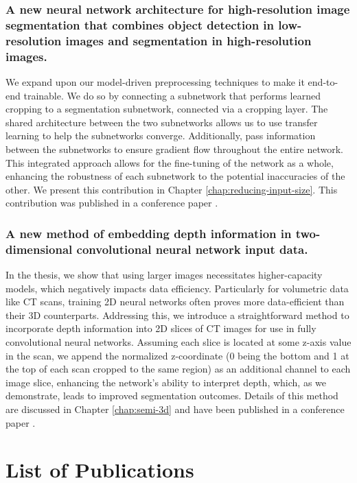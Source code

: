 \subsubsection{A new neural network architecture for high-resolution image segmentation that combines object detection in low-resolution images and segmentation in high-resolution images.}

We expand upon our model-driven preprocessing techniques to make it end-to-end trainable. We do so by connecting a subnetwork that performs learned cropping to a segmentation subnetwork, connected via a cropping layer. The shared architecture between the two subnetworks allows us to use transfer learning to help the subnetworks converge. Additionally, pass information between the subnetworks to ensure gradient flow throughout the entire network. This integrated approach allows for the fine-tuning of the network as a whole, enhancing the robustness of each subnetwork to the potential inaccuracies of the other. We present this contribution in Chapter \ref{chap:reducing-input-size}. This contribution was published in a conference paper \cite{bencevicCropGuidedNeuralNetwork2024}.

\subsubsection{A new method of embedding depth information in two-dimensional convolutional neural network input data.}

In the thesis, we show that using larger images necessitates higher-capacity models, which negatively impacts data efficiency. Particularly for volumetric data like CT scans, training 2D neural networks often proves more data-efficient than their 3D counterparts. Addressing this, we introduce a straightforward method to incorporate depth information into 2D slices of CT images for use in fully convolutional neural networks. Assuming each slice is located at some z-axis value in the scan, we append the normalized z-coordinate (0 being the bottom and 1 at the top of each scan cropped to the same region) as an additional channel to each image slice, enhancing the network's ability to interpret depth, which, as we demonstrate, leads to improved segmentation outcomes. Details of this method are discussed in Chapter \ref{chap:semi-3d} and have been published in a conference paper \cite{bencevicEpicardialAdiposeTissue2021}.

\section{List of Publications}

